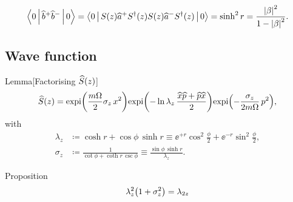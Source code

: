 \begin{equation}
	\Braket{0 | \widehat{b}^+\widehat{b}^- | 0}
	= \Braket{0 | {S}\mathopen{}\left(z\right)\mathclose{}\widehat{a}^+{S^\dagger}\mathopen{}\left(z\right)\mathclose{}
	{S}\mathopen{}\left(z\right)\mathclose{}\widehat{a}^-{S^\dagger}\mathopen{}\left(z\right)\mathclose{} | 0}
	= \sinh^2 r = \frac{{\left|\beta\right|}^2}{1-{\left|\beta\right|}^2}.
\end{equation}

\subsection{Wave function}

\begin{namedthm}{Lemma}[Factorising ${\widehat{S}}\mathopen{}\left(z\right)\mathclose{}$]
\begin{equation}
	{\widehat{S}}\mathopen{}\left(z\right)\mathclose{} =
	{\operatorname{expi}}\mathopen{}\left(\frac{m\Omega}{2}\sigma_z \, x^2\right)\mathclose{}
	{\operatorname{expi}}\mathopen{}\left(-\ln \lambda_z\,\frac{\widehat{x}\widehat{p} + 
			\widehat{p}\widehat{x}}{2}\right)\mathclose{}
	{\operatorname{expi}}\mathopen{}\left(-\frac{\sigma_z}{2m\Omega}\, p^2\right)\mathclose{},
\end{equation}
with
\begin{align}
	\lambda_z &\coloneqq \cosh r + \cos\phi\,\sinh r \equiv
	\ee^{+r} \cos^2\frac{\phi}{2}+\ee^{-r}\sin^2\frac{\phi}{2}, \\
	\sigma_z &\coloneqq \frac{1}{\cot\phi+\coth r\,\csc\phi} \equiv
	\frac{\sin\phi\,\sinh r}{\lambda_z}.
	\end{align}
\end{namedthm} %

\begin{namedthm}{Proposition}
\begin{equation}
\lambda_z^2{\left(1+\sigma_z^2\right)} = \lambda_{2z}
\end{equation}

\end{namedthm} %


